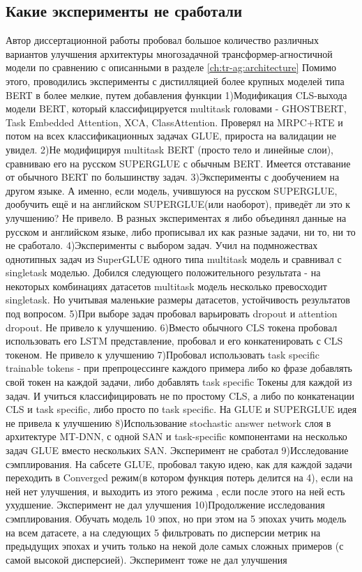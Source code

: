 \subsection{Какие эксперименты не сработали}\label{ch:tr-ag:failed_attempts} 
Автор диссертационной работы пробовал большое количество различных вариантов улучшения архитектуры многозадачной трансформер-агностичной модели по сравнению с описанными в разделе \ref{ch:tr-ag:architecture} 
Помимо этого, проводились эксперименты с дистилляцией более крупных моделей типа BERT в более мелкие, путем добавления функции 
1)Модификация CLS-выхода модели BERT, который классифицируется multitask головами - GHOSTBERT, Task Embedded Attention, XCA, ClassAttention. Проверял на MRPC+RTE и потом на всех классификационных задачах GLUE, прироста на валидации не увидел.
2)Не модифицируя multitask BERT (просто тело и линейные слои), сравниваю его на русском SUPERGLUE с обычным BERT. Имеется отставание от обычного BERT по большинству задач.
3)Эксперименты с дообучением на другом языке. А именно, если модель, учившуюся на русском SUPERGLUE, дообучить ещё и на английском SUPERGLUE(или наоборот), приведёт ли это к улучшению? Не привело. В разных экспериментах я либо объединял данные на русском и английском языке, либо прописывал их как разные задачи, ни то, ни то не сработало.
4)Эксперименты с выбором задач. Учил на подмножествах однотипных задач из SuperGLUE одного типа multitask модель и сравнивал с singletask моделью. Добился следующего положительного результата - на некоторых комбинациях датасетов multitask модель несколько превосходит singletask. Но учитывая маленькие размеры датасетов, устойчивость результатов под вопросом.
5)При выборе задач пробовал варьировать dropout и attention dropout. Не привело к улучшению.
6)Вместо обычного CLS токена пробовал использовать его LSTM представление, пробовал и его конкатенировать с CLS токеном. Не привело к улучшению
7)Пробовал использовать task specific trainable tokens - при препроцессинге каждого примера либо ко фразе добавлять свой токен на каждой задачи, либо добавлять task specific Токены для каждой из задач. И учиться классифицировать не по простому CLS, а либо по конкатенации CLS и task specific, либо просто по task specific. На GLUE и SUPERGLUE идея не привела к улучшению
8)Использование stochastic answer network слоя в архитектуре MT-DNN, с одной SAN и task-specific компонентами на несколько задач GLUE вместо нескольких SAN. Эксперимент не сработал
9)Исследование сэмплирования. На сабсете GLUE, пробовал такую идею, как для каждой задачи переходить в Converged режим(в котором функция потерь делится на 4), если на ней нет улучшения, и выходить из этого режима , если после этого на ней есть ухудшение. Эксперимент не дал улучшения
10)Продолжение исследования сэмплирования. Обучать модель 10 эпох, но при этом на 5 эпохах учить модель на всем датасете, а на следующих 5 фильтровать по дисперсии метрик на предыдущих эпохах и учить только на некой доле самых сложных примеров (с самой высокой дисперсией). Эксперимент тоже не дал улучшения



